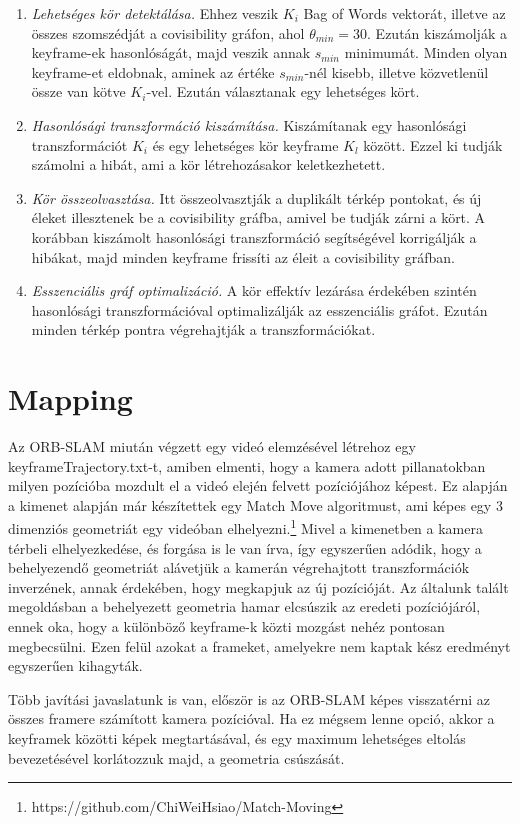 \begin{enumerate}
	\item \textit{Lehetséges kör detektálása.} Ehhez veszik $K_i$ Bag of Words vektorát, illetve az összes szomszédját a covisibility gráfon, ahol $\theta_{min} = 30$. Ezután kiszámolják a keyframe-ek hasonlóságát, majd veszik annak $s_{min}$ minimumát. Minden olyan keyframe-et eldobnak, aminek az értéke $s_{min}$-nél kisebb, illetve közvetlenül össze van kötve $K_i$-vel. Ezután választanak egy lehetséges kört.
	\item \textit{Hasonlósági transzformáció kiszámítása.} Kiszámítanak egy hasonlósági transzformációt $K_i$ és egy lehetséges kör keyframe $K_l$ között. Ezzel ki tudják számolni a hibát, ami a kör létrehozásakor keletkezhetett.
	\item \textit{Kör összeolvasztása.} Itt összeolvasztják a duplikált térkép pontokat, és új éleket illesztenek be a covisibility gráfba, amivel be tudják zárni a kört. A korábban kiszámolt hasonlósági transzformáció segítségével korrigálják a hibákat, majd minden keyframe frissíti az éleit a covisibility gráfban.
	\item \textit{Esszenciális gráf optimalizáció.} A kör effektív lezárása érdekében szintén hasonlósági transzformációval optimalizálják az esszenciális gráfot. Ezután minden térkép pontra végrehajtják a transzformációkat.
\end{enumerate}

\section{Mapping}

Az ORB-SLAM miután végzett egy videó elemzésével létrehoz egy keyframeTrajectory.txt-t, amiben elmenti, hogy a kamera adott pillanatokban milyen pozícióba mozdult el a videó elején felvett pozíciójához képest.
Ez alapján a kimenet alapján már készítettek egy Match Move algoritmust, ami képes egy 3 dimenziós geometriát egy videóban elhelyezni.\footnote{https://github.com/ChiWeiHsiao/Match-Moving}
Mivel a kimenetben a kamera térbeli elhelyezkedése, és forgása is le van írva, így egyszerűen adódik, hogy a behelyezendő geometriát alávetjük a kamerán végrehajtott transzformációk inverzének, annak érdekében, hogy megkapjuk az új pozícióját.
Az általunk talált megoldásban a behelyezett geometria hamar elcsúszik az eredeti pozíciójáról, ennek oka, hogy a különböző keyframe-k közti mozgást nehéz pontosan megbecsülni.
Ezen felül azokat a frameket, amelyekre nem kaptak kész eredményt egyszerűen kihagyták.

Több javítási javaslatunk is van, először is az ORB-SLAM képes visszatérni az összes framere számított kamera pozícióval.
Ha ez mégsem lenne opció, akkor a keyframek közötti képek megtartásával, és egy maximum lehetséges eltolás bevezetésével korlátozzuk majd, a geometria csúszását.